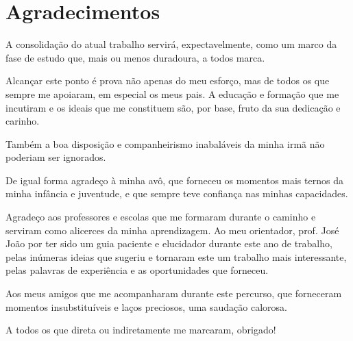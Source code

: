 \chapter*{Agradecimentos}
\setlength{\parskip}{1em}

A consolidação do atual trabalho servirá, expectavelmente, como um marco da fase de estudo que, mais ou menos duradoura, a todos marca.

Alcançar este ponto é prova não apenas do meu esforço, mas de todos os que sempre me apoiaram, em especial os meus pais. A educação e formação que me incutiram e os ideais que me constituem são, por base, fruto da sua dedicação e carinho. 

Também a boa disposição e companheirismo inabaláveis da minha irmã não poderiam ser ignorados.

De igual forma agradeço à minha avô, que forneceu os momentos mais ternos da minha infância e juventude, e que sempre teve confiança nas minhas capacidades. 

Agradeço aos professores e escolas que me formaram durante o caminho e serviram como alicerces da minha aprendizagem. Ao meu orientador, prof. José João por ter sido um guia paciente e elucidador durante este ano de trabalho, pelas inúmeras ideias que sugeriu e tornaram este um trabalho mais interessante, pelas palavras de experiência e as oportunidades que forneceu.

Aos meus amigos que me acompanharam durante este percurso, que forneceram momentos insubstituíveis e laços preciosos, uma saudação calorosa.

A todos os que direta ou indiretamente me marcaram, obrigado!

\setlength{\parskip}{0em}